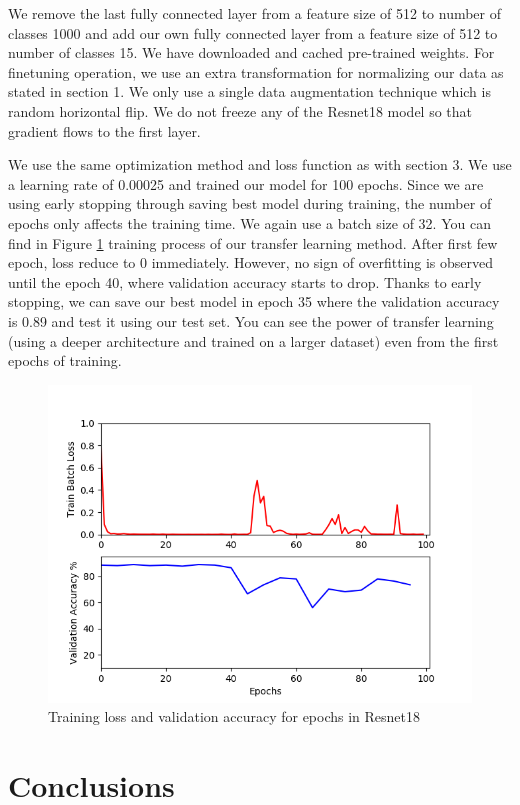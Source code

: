 \documentclass{article}
\begin{document}
We remove the last fully connected layer from a feature size of 512 to number of classes 1000 and add our own fully connected layer from a feature size of 512 to number of classes 15. We have downloaded and cached pre-trained weights. For finetuning operation, we use an extra transformation for normalizing our data as stated in section 1. We only use a single data augmentation technique which is random horizontal flip. We do not freeze any of the Resnet18 model so that gradient flows to the first layer.

We use the same optimization method and loss function as with section 3. We use a learning rate of 0.00025 and trained our model for 100 epochs. Since we are using early stopping through saving best model during training, the number of epochs only affects the training time. We again use a batch size of 32. You can find in Figure \ref{fig:resnet18TrainingProcess} training process of our transfer learning method. After first few epoch, loss reduce to 0 immediately. However, no sign of overfitting is observed until the epoch 40, where validation accuracy starts to drop. Thanks to early stopping, we can save our best model in epoch 35 where the validation accuracy is 0.89 and test it using our test set. You can see the power of transfer learning (using a deeper architecture and trained on a larger dataset) even from the first epochs of training.

\begin{figure}
  \includegraphics[width=\linewidth]{resnet18TrainingProcess.png}
  \caption{Training loss and validation accuracy for epochs in Resnet18}
  \label{fig:resnet18TrainingProcess}
\end{figure}

\section{Conclusions}
 
{\small


}
\end{document}
